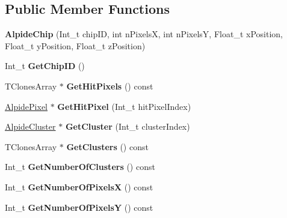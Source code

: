 \subsection*{Public Member Functions}
\begin{DoxyCompactItemize}
\item 
\mbox{\label{class_alpide_chip_a47ab0342d5f7c1777c30a1369cbb751f}} 
{\bfseries Alpide\+Chip} (Int\+\_\+t chip\+ID, int n\+PixelsX, int n\+PixelsY, Float\+\_\+t x\+Position, Float\+\_\+t y\+Position, Float\+\_\+t z\+Position)
\item 
\mbox{\label{class_alpide_chip_a27394d6a941d5df23ac4173eaa6e3839}} 
Int\+\_\+t {\bfseries Get\+Chip\+ID} ()
\item 
\mbox{\label{class_alpide_chip_a4168f156f69f1100c4cfe06aef85ae95}} 
T\+Clones\+Array $\ast$ {\bfseries Get\+Hit\+Pixels} () const
\item 
\mbox{\label{class_alpide_chip_a24de2e9b8497f17a1d6a147edf0d08e3}} 
\mbox{\hyperlink{class_alpide_pixel}{Alpide\+Pixel}} $\ast$ {\bfseries Get\+Hit\+Pixel} (Int\+\_\+t hit\+Pixel\+Index)
\item 
\mbox{\label{class_alpide_chip_a200877fe78489ccae1d0800001288a6f}} 
\mbox{\hyperlink{class_alpide_cluster}{Alpide\+Cluster}} $\ast$ {\bfseries Get\+Cluster} (Int\+\_\+t cluster\+Index)
\item 
\mbox{\label{class_alpide_chip_a7f33e43ee0663befd9ad50aa9ea385b4}} 
T\+Clones\+Array $\ast$ {\bfseries Get\+Clusters} () const
\item 
\mbox{\label{class_alpide_chip_a6e6b7a48b667c842de38795a9e1d2da2}} 
Int\+\_\+t {\bfseries Get\+Number\+Of\+Clusters} () const
\item 
\mbox{\label{class_alpide_chip_a79d2452071a75349b4b10d76255b5216}} 
Int\+\_\+t {\bfseries Get\+Number\+Of\+PixelsX} () const
\item 
\mbox{\label{class_alpide_chip_a781488dc5a30088419a67d6a1afec305}} 
Int\+\_\+t {\bfseries Get\+Number\+Of\+PixelsY} () const

\end{DoxyCompactItemize}
